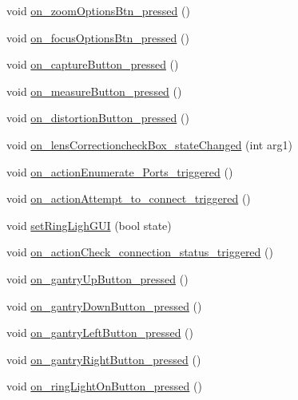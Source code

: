 \begin{DoxyCompactItemize}
\item 
void \mbox{\hyperlink{classMainWindow_aaf176f5c10001cdcf845f1250232be9a}{on\+\_\+zoom\+Options\+Btn\+\_\+pressed}} ()
\item 
void \mbox{\hyperlink{classMainWindow_ac3ebf4a093bf8190311ec0c146ea3bbc}{on\+\_\+focus\+Options\+Btn\+\_\+pressed}} ()
\item 
void \mbox{\hyperlink{classMainWindow_a2a1fcefe2bf1f110eb2c589ac57b07d7}{on\+\_\+capture\+Button\+\_\+pressed}} ()
\item 
void \mbox{\hyperlink{classMainWindow_aa9bd65042eb23d5fa3f548da285067a6}{on\+\_\+measure\+Button\+\_\+pressed}} ()
\item 
void \mbox{\hyperlink{classMainWindow_ab98ee5c1e01d4db75d27e3f00c7c4b78}{on\+\_\+distortion\+Button\+\_\+pressed}} ()
\item 
void \mbox{\hyperlink{classMainWindow_a67e14c051d3926ca57a97c271dcf7013}{on\+\_\+lens\+Correctioncheck\+Box\+\_\+state\+Changed}} (int arg1)
\item 
void \mbox{\hyperlink{classMainWindow_a46438ceaa867139cda643f2704fc7f55}{on\+\_\+action\+Enumerate\+\_\+\+Ports\+\_\+triggered}} ()
\item 
void \mbox{\hyperlink{classMainWindow_aea8024d64cc8d8b805b66a45524e753e}{on\+\_\+action\+Attempt\+\_\+to\+\_\+connect\+\_\+triggered}} ()
\item 
void \mbox{\hyperlink{classMainWindow_a64190d66464e087f1df9ba7541ae52ff}{set\+Ring\+Ligh\+G\+UI}} (bool state)
\item 
void \mbox{\hyperlink{classMainWindow_aa6925b9f63240473ebb0baeb0caf51d5}{on\+\_\+action\+Check\+\_\+connection\+\_\+status\+\_\+triggered}} ()
\item 
void \mbox{\hyperlink{classMainWindow_a6977641f537b731bb9ede0c341388fb1}{on\+\_\+gantry\+Up\+Button\+\_\+pressed}} ()
\item 
void \mbox{\hyperlink{classMainWindow_a04c1e4428230f33e991ff87aed62575f}{on\+\_\+gantry\+Down\+Button\+\_\+pressed}} ()
\item 
void \mbox{\hyperlink{classMainWindow_a116f8869b68f5d57afe1849fd1f0f0f7}{on\+\_\+gantry\+Left\+Button\+\_\+pressed}} ()
\item 
void \mbox{\hyperlink{classMainWindow_a2456f40cbc5747391f01b61c59edd6dd}{on\+\_\+gantry\+Right\+Button\+\_\+pressed}} ()
\item 
void \mbox{\hyperlink{classMainWindow_ac7c8a9d8f85ea41b9017fb13c95c3e79}{on\+\_\+ring\+Light\+On\+Button\+\_\+pressed}} ()
\item 

\end{DoxyCompactItemize}
